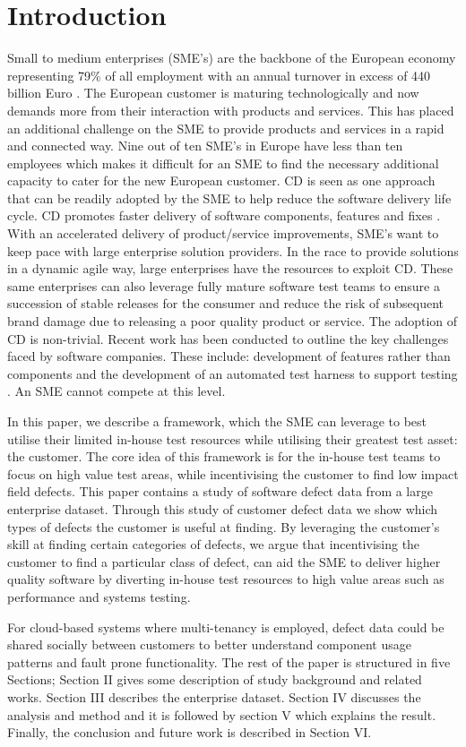 \documentclass[conference]{IEEEtran}
\begin{document}
\section{Introduction}
Small to medium enterprises (SME's) are the backbone of the European economy representing 79\% of all employment with an annual turnover in excess of 440 billion Euro \cite{eurocom2014sme}. The European customer is maturing technologically and now demands more from their interaction with products and services. This has placed an additional challenge on the SME to provide products and services in a rapid and connected way. Nine out of ten SME's in Europe have less than ten employees \cite{eurocom2014sme} which makes it difficult for an SME to find the necessary additional capacity to cater for the new European customer.  CD is seen as one approach that can be readily adopted by the SME to help reduce the software delivery life cycle. CD promotes faster delivery of software components, features and fixes \cite{humble2010continuous}. With an accelerated delivery of product/service improvements, SME's want to keep pace with large enterprise solution providers.  In the race to provide solutions in a dynamic agile way, large enterprises have the resources to exploit CD. These same enterprises can also leverage fully mature software test teams to ensure a succession of stable releases for the consumer and reduce the risk of subsequent brand damage due to releasing a poor quality product or service. The adoption of CD is non-trivial.  Recent work has been conducted to outline the key challenges faced by software companies. These include: development of features rather than components and the development of an automated test harness to support testing \cite{olsson2012climbing}. An SME cannot compete at this level. \par
In this paper, we describe a framework, which the SME can leverage to best utilise their limited in-house test resources while utilising their greatest test asset: the customer. The core idea of this framework is for the in-house test teams to focus on high value test areas, while incentivising the customer to find   low impact field defects. This paper contains a study of software defect data from a large enterprise dataset. Through this study of customer defect data we show which types of defects the customer is useful at finding. By leveraging the customer's skill at finding certain categories of defects, we argue that incentivising the customer to find a particular class of defect, can aid the SME to deliver higher quality software by diverting in-house test resources to high value areas such as performance and systems testing.  \par
For cloud-based systems where multi-tenancy is employed, defect data could be shared socially between customers to better understand component usage patterns and fault prone functionality. The rest of the paper is structured in five Sections; Section II gives some description of study background and related works. Section III describes the enterprise dataset. Section IV discusses the analysis and method and it is followed by section V which explains the result. Finally, the conclusion and future work is described in Section VI.
\end{document}
